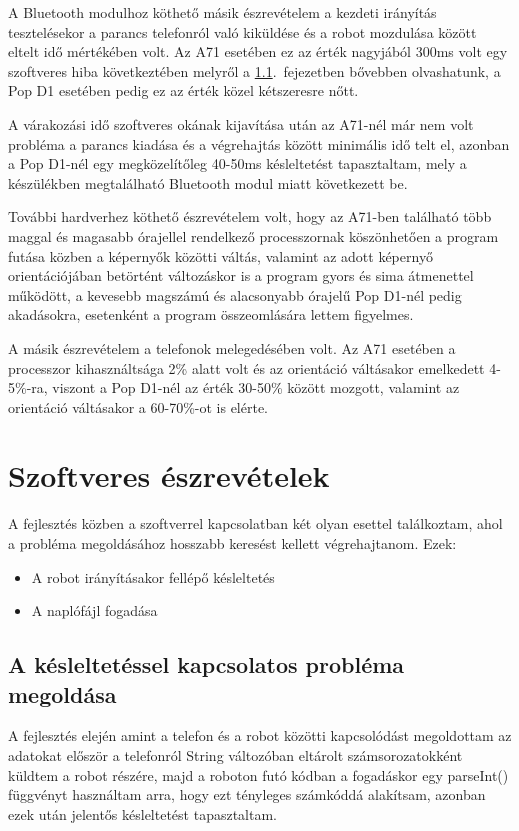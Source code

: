 \documentclass[]{thesis-ekf}
\theoremstyle{definition}
\begin{document}
A Bluetooth modulhoz köthető másik észrevételem a kezdeti irányítás tesztelésekor a parancs telefonról való kiküldése és a robot mozdulása között eltelt idő mértékében volt. Az A71 esetében ez az érték nagyjából 300ms volt egy szoftveres hiba következtében melyről a \ref{lag}.~fejezetben bővebben olvashatunk, a Pop D1 esetében pedig ez az érték közel kétszeresre nőtt.

A várakozási idő szoftveres okának kijavítása után az A71-nél már nem volt probléma a parancs kiadása és a végrehajtás között minimális idő telt el, azonban a Pop D1-nél egy megközelítőleg 40-50ms késleltetést tapasztaltam, mely a készülékben megtalálható Bluetooth modul miatt következett be.

További hardverhez köthető észrevételem volt, hogy az A71-ben található több maggal és magasabb órajellel rendelkező processzornak köszönhetően a program futása közben a képernyők közötti váltás, valamint az adott képernyő orientációjában betörtént változáskor is a program gyors és sima átmenettel működött, a kevesebb magszámú és alacsonyabb órajelű Pop D1-nél pedig akadásokra, esetenként a program összeomlására lettem figyelmes.

A másik észrevételem a telefonok melegedésében volt. Az A71 esetében a processzor kihasználtsága 2\% alatt volt és az orientáció váltásakor emelkedett 4-5\%-ra, viszont a Pop D1-nél az érték 30-50\% között mozgott, valamint az orientáció váltásakor a 60-70\%-ot is elérte.
\section{Szoftveres észrevételek}
A fejlesztés közben a szoftverrel kapcsolatban két olyan esettel találkoztam, ahol a probléma megoldásához hosszabb keresést kellett végrehajtanom. Ezek:
\begin{itemize}
	\item A robot irányításakor fellépő késleltetés
	\item A naplófájl fogadása
\end{itemize}
\subsection{A késleltetéssel kapcsolatos probléma megoldása}\label{lag}
A fejlesztés elején amint a telefon és a robot közötti kapcsolódást megoldottam az adatokat először a telefonról String változóban eltárolt számsorozatokként küldtem a robot részére, majd a roboton futó kódban a fogadáskor egy parseInt() függvényt használtam arra, hogy ezt tényleges számkóddá alakítsam, azonban ezek után jelentős késleltetést tapasztaltam.
\end{document}
